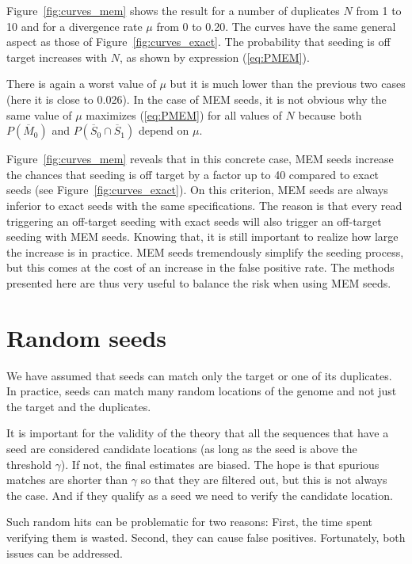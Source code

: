 \documentclass{article}
\begin{document}
Figure~\ref{fig:curves_mem} shows the result for a number of duplicates $N$
from 1 to 10 and for a divergence rate $\mu$ from 0 to 0.20. The curves
have the same general aspect as those of Figure~\ref{fig:curves_exact}. The
probability that seeding is off target increases with $N$, as shown by
expression (\ref{eq:PMEM}).

There is again a  worst value of $\mu$ but it is much lower than the
previous two cases (here it is close to 0.026). In the case of MEM seeds,
it is not obvious why the same value of $\mu$ maximizes (\ref{eq:PMEM})
for all values of $N$ because both $P(\overline{M}_0)$ and
$P(\overline{S}_0 \cap \overline{S}_1)$ depend on $\mu$.

Figure~\ref{fig:curves_mem} reveals that in this concrete case, MEM seeds
increase the chances that seeding is off target by a factor up to 40
compared to exact seeds (see Figure~\ref{fig:curves_exact}). On this
criterion, MEM seeds are always inferior to exact seeds with the same
specifications. The reason is that every read triggering an off-target
seeding with exact seeds will also trigger an off-target seeding with MEM
seeds. Knowing that, it is still important to realize how large the
increase is in practice. MEM seeds tremendously simplify the seeding
process, but this comes at the cost of an increase in the false positive
rate. The methods presented here are thus very useful to balance the
risk when using MEM seeds.


\section{Random seeds}
\label{sec:random_seeds}

We have assumed that seeds can match only the target or one of its
duplicates. In practice, seeds can match many random locations of the
genome and not just the target and the duplicates.

It is important for the validity of the theory that all the sequences that
have a seed are considered candidate locations (as long as the seed is
above the threshold $\gamma$). If not, the final estimates are biased. The
hope is that spurious matches are shorter than $\gamma$ so that they are
filtered out, but this is not always the case. And if they qualify as a
seed we need to verify the candidate location.

Such random hits can be problematic for two reasons: First, the time spent
verifying them is wasted. Second, they can cause false positives.
Fortunately, both issues can be addressed.
\end{document}
